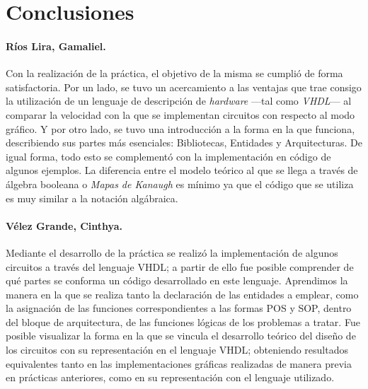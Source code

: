 \documentclass[../main.tex]{subfiles}
\begin{document}
\clearpage
\section{Conclusiones}
\paragraph{Ríos Lira, Gamaliel.} Con la realización de la práctica, el 
objetivo de la misma se cumplió de forma satisfactoria. Por un lado, se tuvo 
un acercamiento a las ventajas que trae consigo la utilización de un lenguaje 
de descripción de \textit{hardware} ---tal como \textit{VHDL}--- al comparar 
la velocidad con la que se implementan circuitos con respecto al modo gráfico.  
Y por otro lado, se tuvo una introducción a la forma en la que funciona, 
describiendo sus partes más esenciales: Bibliotecas, Entidades y 
Arquitecturas. De igual forma, todo esto se complementó con la implementación 
en código de algunos ejemplos. La diferencia entre el modelo teórico al que se 
llega a través de álgebra booleana o \textit{Mapas de Kanaugh} es mínimo ya 
que el código que se utiliza es muy similar a la notación algábraica.

\paragraph{Vélez Grande, Cinthya.}
Mediante el desarrollo de la práctica se realizó la implementación de algunos 
circuitos a través del lenguaje VHDL; a partir de ello fue posible comprender 
de qué partes se conforma un código desarrollado en este lenguaje. Aprendimos 
la manera en la que se realiza tanto la declaración de las entidades a 
emplear, como la asignación de las funciones correspondientes a las formas POS 
y SOP, dentro del bloque de arquitectura, de las funciones lógicas de los 
problemas a tratar.
Fue posible visualizar la forma en la que se vincula el desarrollo teórico del 
diseño de los circuitos con su representación en el lenguaje VHDL; obteniendo 
resultados equivalentes tanto en las implementaciones gráficas realizadas de 
manera previa en prácticas anteriores, como en su representación con el 
lenguaje utilizado.
\end{document}
